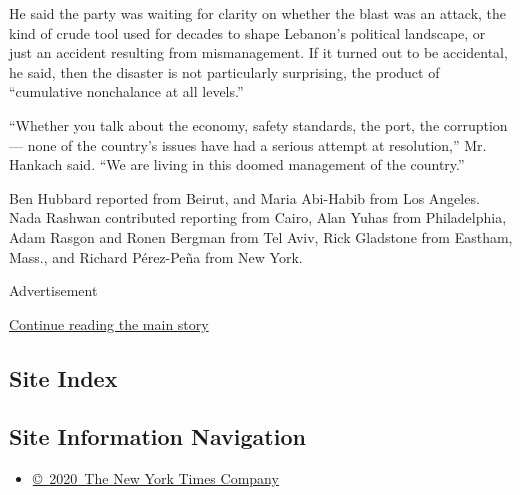 He said the party was waiting for clarity on whether the blast was an
attack, the kind of crude tool used for decades to shape Lebanon's
political landscape, or just an accident resulting from mismanagement.
If it turned out to be accidental, he said, then the disaster is not
particularly surprising, the product of ``cumulative nonchalance at all
levels.''

``Whether you talk about the economy, safety standards, the port, the
corruption --- none of the country's issues have had a serious attempt
at resolution,'' Mr. Hankach said. ``We are living in this doomed
management of the country.''

Ben Hubbard reported from Beirut, and Maria Abi-Habib from Los Angeles.
Nada Rashwan contributed reporting from Cairo, Alan Yuhas from
Philadelphia, Adam Rasgon and Ronen Bergman from Tel Aviv, Rick
Gladstone from Eastham, Mass., and Richard Pérez-Peña from New York.

Advertisement

\protect\hyperlink{after-bottom}{Continue reading the main story}

\hypertarget{site-index}{%
\subsection{Site Index}\label{site-index}}

\hypertarget{site-information-navigation}{%
\subsection{Site Information
Navigation}\label{site-information-navigation}}

\begin{itemize}
\tightlist
\item
  \href{https://help.nytimes3xbfgragh.onion/hc/en-us/articles/115014792127-Copyright-notice}{©~2020~The
  New York Times Company}
\end{itemize}

